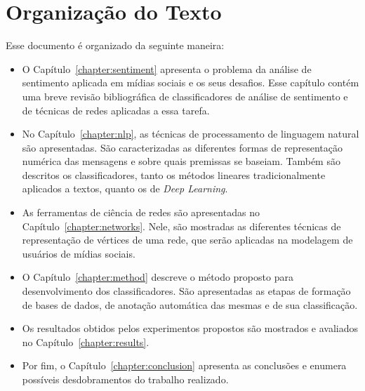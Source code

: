 \section{Organização do Texto}

Esse documento é organizado da seguinte maneira:

\begin{itemize}
    \item O Capítulo~\ref{chapter:sentiment} apresenta o problema da análise
        de sentimento aplicada em mídias sociais e os seus desafios.
        Esse capítulo contém uma breve revisão bibliográfica de classificadores
        de análise de sentimento e de técnicas de redes aplicadas a essa tarefa.
    \item No Capítulo~\ref{chapter:nlp}, as técnicas de processamento de
        linguagem natural são apresentadas.
        São caracterizadas as diferentes formas de representação numérica das
        mensagens e sobre quais premissas se baseiam.
        Também são descritos os classificadores, tanto os métodos lineares
        tradicionalmente aplicados a textos, quanto os de \textit{Deep Learning}.
    \item As ferramentas de ciência de redes são apresentadas no
        Capítulo~\ref{chapter:networks}.
        Nele, são mostradas as diferentes técnicas de representação de
        vértices de uma rede, que serão aplicadas na modelagem de usuários de
        mídias sociais.
    \item O Capítulo~\ref{chapter:method} descreve o método proposto para
        desenvolvimento dos classificadores.
        São apresentadas as etapas de formação de bases de dados, de anotação
        automática das mesmas e de sua classificação.
    \item Os resultados obtidos pelos experimentos propostos são mostrados e
        avaliados no Capítulo~\ref{chapter:results}.
    \item Por fim, o Capítulo~\ref{chapter:conclusion} apresenta as conclusões
        e enumera possíveis desdobramentos do trabalho realizado.
\end{itemize}
